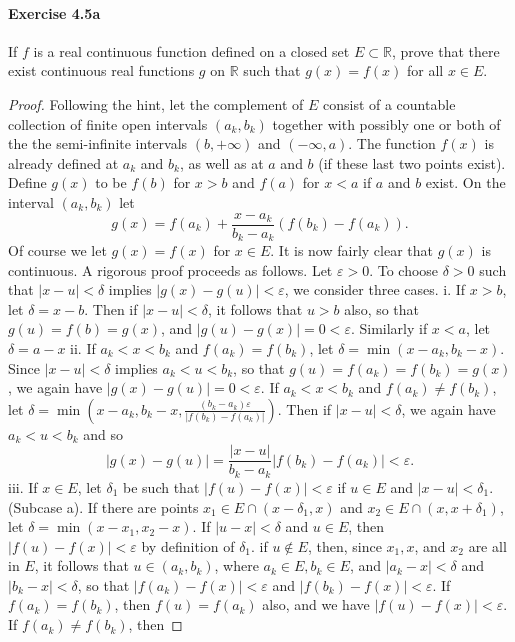 \documentclass{article}
\theoremstyle{definition}
\begin{document}
\paragraph{Exercise 4.5a} If $f$ is a real continuous function defined on a closed set $E \subset \mathbb{R}$, prove that there exist continuous real functions $g$ on $\mathbb{R}$ such that $g(x)=f(x)$ for all $x \in E$.
\begin{proof}
Following the hint, let the complement of $E$ consist of a countable collection of finite open intervals $\left(a_k, b_k\right)$ together with possibly one or both of the the semi-infinite intervals $(b,+\infty)$ and $(-\infty, a)$. The function $f(x)$ is already defined at $a_k$ and $b_k$, as well as at $a$ and $b$ (if these last two points exist). Define $g(x)$ to be $f(b)$ for $x>b$ and $f(a)$ for $x<a$ if $a$ and $b$ exist. On the interval $\left(a_k, b_k\right)$ let
$$
g(x)=f\left(a_k\right)+\frac{x-a_k}{b_k-a_k}\left(f\left(b_k\right)-f\left(a_k\right)\right) .
$$
Of course we let $g(x)=f(x)$ for $x \in E$. It is now fairly clear that $g(x)$ is continuous. A rigorous proof proceeds as follows. Let $\varepsilon>0$. To choose $\delta>0$ such that $|x-u|<\delta$ implies $|g(x)-g(u)|<\varepsilon$, we consider three cases.
i. If $x>b$, let $\delta=x-b$. Then if $|x-u|<\delta$, it follows that $u>b$ also, so that $g(u)=f(b)=g(x)$, and $|g(u)-g(x)|=0<\varepsilon$. Similarly if $x<a$, let $\delta=a-x$
ii. If $a_k<x<b_k$ and $f\left(a_k\right)=f\left(b_k\right)$, let $\delta=\min \left(x-a_k, b_k-x\right)$. Since $|x-u|<\delta$ implies $a_k<u<b_k$, so that $g(u)=f\left(a_k\right)=f\left(b_k\right)=g(x)$, we again have $|g(x)-g(u)|=0<\varepsilon$. If $a_k<x<b_k$ and $f\left(a_k\right) \neq f\left(b_k\right)$, let $\delta=\min \left(x-a_k, b_k-x, \frac{\left(b_k-a_k\right) \varepsilon}{\left|f\left(b_k\right)-f\left(a_k\right)\right|}\right)$. Then if $|x-u|<\delta$, we again have $a_k<u<b_k$ and so
$$
|g(x)-g(u)|=\frac{|x-u|}{b_k-a_k}\left|f\left(b_k\right)-f\left(a_k\right)\right|<\varepsilon .
$$
iii. If $x \in E$, let $\delta_1$ be such that $|f(u)-f(x)|<\varepsilon$ if $u \in E$ and $|x-u|<\delta_1$. (Subcase a). If there are points $x_1 \in E \cap\left(x-\delta_1, x\right)$ and $x_2 \in E \cap\left(x, x+\delta_1\right)$, let $\delta=\min \left(x-x_1, x_2-x\right)$. If $|u-x|<\delta$ and $u \in E$, then $|f(u)-f(x)|<\varepsilon$ by definition of $\delta_1$. if $u \notin E$, then, since $x_1, x$, and $x_2$ are all in $E$, it follows that $u \in\left(a_k, b_k\right)$, where $a_k \in E, b_k \in E$, and $\left|a_k-x\right|<\delta$ and $\left|b_k-x\right|<\delta$, so that $\left|f\left(a_k\right)-f(x)\right|<\varepsilon$ and $\left|f\left(b_k\right)-f(x)\right|<\varepsilon$. If $f\left(a_k\right)=f\left(b_k\right)$, then $f(u)=f\left(a_k\right)$ also, and we have $|f(u)-f(x)|<\varepsilon$. If $f\left(a_k\right) \neq f\left(b_k\right)$, then

\end{proof}
\end{document}
